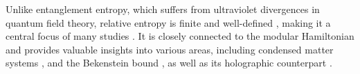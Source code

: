 \documentclass[12pt]{article}
\begin{document}
Unlike entanglement entropy, which suffers from ultraviolet divergences in quantum field theory, relative entropy is finite and well-defined \cite{Witten:2018zxz}, making it a central focus of many studies \cite{Casini:2016udt, Casini:2008cr, Blanco:2013joa, Jafferis:2015del, Lashkari:2014yva, Lashkari:2015dia, Sarosi:2016oks, Ugajin:2016opf, Sarosi:2016atx, Balasubramanian:2014bfa, Ruggiero:2016khg, Ugajin:2018rwd, Bao:2019aol, Brehm:2020zri,deBoer:2023lrd, Ugajin:2020dyd}. It is closely connected to the modular Hamiltonian \cite{Lashkari:2015dia} and provides valuable insights into various areas, including condensed matter systems \cite{Zhou:2008zza, Zanardi:2006mgo}, and the Bekenstein bound \cite{Casini:2008cr}, as well as its holographic counterpart \cite{Blanco:2013joa, Jafferis:2015del, Bao:2019aol}.

\end{document}

